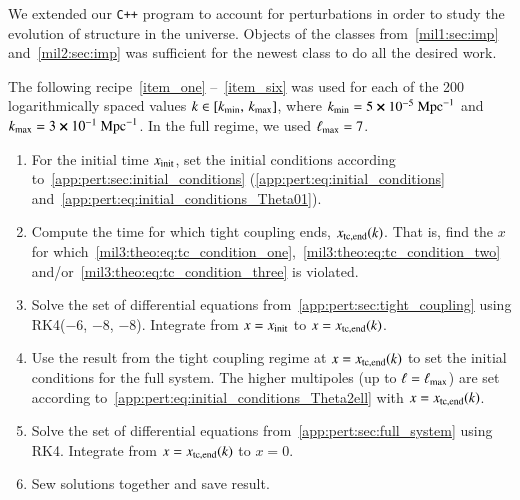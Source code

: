 


We extended our \verb|C++| program to account for perturbations in order to study the evolution of structure in the universe. Objects of the classes from~\cref{mil1:sec:imp} and~\cref{mil2:sec:imp} was sufficient for the newest class to do all the desired work. 



The following recipe~\ref{item_one} --~\ref{item_six} was used for each of the 200 logarithmically spaced values $k\in [k_\mathrm{min},\, k_\mathrm{max}]$, where $k_\mathrm{min} = 5\cross10^{-5}~\mathrm{Mpc}^{-1}$ and $k_\mathrm{max}=3\cross 10^{-1}~\mathrm{Mpc}^{-1}$. In the full regime, we used $\ell_\mathrm{max}=7$.

\begin{enumerate}[wide,labelwidth=!,labelindent=0pt,label=(\roman*)]
    \item\label{item_one} 
    For the initial time $x_\mathrm{init}$, set the initial conditions according to~\cref{app:pert:sec:initial_conditions} (\cref{app:pert:eq:initial_conditions} and~\eqref{app:pert:eq:initial_conditions_Theta01}). 

    \item\label{item_two} 
    
    Compute the time for which tight coupling ends, $x_\mathrm{tc,end}(k)$. That is, find the $x$ for which~\cref{mil3:theo:eq:tc_condition_one},~\eqref{mil3:theo:eq:tc_condition_two} and/or~\eqref{mil3:theo:eq:tc_condition_three} is violated. 
    
    \item\label{item_three}
    
    Solve the set of differential equations from~\cref{app:pert:sec:tight_coupling} using RK4($-6$, $-8$, $-8$). Integrate from $x=x_\mathrm{init}$ to $x=x_\mathrm{tc,end}(k)$.

    \item\label{item_four}
    
    Use the result from the tight coupling regime at $x=x_\mathrm{tc,end}(k)$ to set the initial conditions for the full system. The higher multipoles (up to $\ell=\ell_\mathrm{max}$) are set according to~\cref{app:pert:eq:initial_conditions_Theta2ell} with $x=x_\mathrm{tc,end}(k)$. 

    \item\label{item_five}
    
    Solve the set of differential equations from~\cref{app:pert:sec:full_system} using RK4. Integrate from $x=x_\mathrm{tc,end}(k)$ to $x=0$. 

    \item\label{item_six}
    
    Sew solutions together and save result.

\end{enumerate}
 
